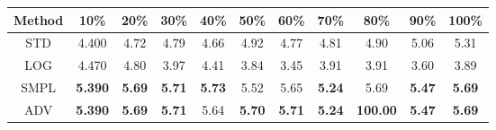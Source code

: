 \documentclass{standalone}
\begin{document}
\begin{tabular}{c|cccccccccc}
      \toprule
      Method & 10\% & 20\% & 30\% & 40\% & 50\% & 60\% & 70\% & 80\% & 90\% & 100\% \\
      \midrule
STD & 4.400 & 4.72 & 4.79 & 4.66 & 4.92 & 4.77 & 4.81 & 4.90 & 5.06 & 5.31\\
LOG & 4.470 & 4.80 & 3.97 & 4.41 & 3.84 & 3.45 & 3.91 & 3.91 & 3.60 & 3.89\\
SMPL & \textbf{5.390} & \textbf{5.69} & \textbf{5.71} & \textbf{5.73} & 5.52 & 5.65 & \textbf{5.24} & 5.69 & \textbf{5.47} & \textbf{5.69}\\
ADV & \textbf{5.390} & \textbf{5.69} & \textbf{5.71} & 5.64 & \textbf{5.70} & \textbf{5.71} & \textbf{5.24} & \textbf{100.00} & \textbf{5.47} & \textbf{5.69}\\
  \bottomrule
\end{tabular}
\end{document}
